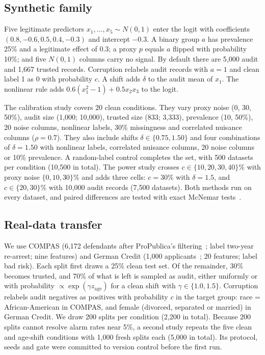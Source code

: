\documentclass[conference]{IEEEtran}
\begin{document}
\subsection{Synthetic family}
Five legitimate predictors $x_1,\dots,x_5\sim N(0,1)$ enter the logit with coefficients $(0.8,-0.6,0.5,0.4,-0.3)$ and intercept $-0.3$. A binary group $a$ has prevalence 25\% and a legitimate effect of 0.3; a proxy $p$ equals $a$ flipped with probability 10\%; and five $N(0,1)$ columns carry no signal. By default there are 5,000 audit and 1,667 trusted records. Corruption relabels audit records with $a=1$ and clean label 1 as 0 with probability $c$. A shift adds $\delta$ to the audit mean of $x_1$. The nonlinear rule adds $0.6(x_1^2-1)+0.5x_2x_3$ to the logit.

The calibration study covers 20 clean conditions. They vary proxy noise (0, 30, 50\%), audit size (1,000; 10,000), trusted size (833; 3,333), prevalence (10, 50\%), 20 noise columns, nonlinear labels, 30\% missingness and correlated nuisance columns ($\rho=0.7$). They also include shifts $\delta\in\{0.75,1.50\}$ and four combinations of $\delta=1.50$ with nonlinear labels, correlated nuisance columns, 20 noise columns or 10\% prevalence. A random-label control completes the set, with 500 datasets per condition (10,500 in total). The power study crosses $c\in\{10,20,30,40\}\%$ with proxy noise $\{0,10,30\}\%$ and adds three cells: $c=30\%$ with $\delta=1.5$, and $c\in\{20,30\}\%$ with 10,000 audit records (7,500 datasets). Both methods run on every dataset, and paired differences are tested with exact McNemar tests~\cite{mcnemar1947note}.

\subsection{Real-data transfer}
We use COMPAS (6,172 defendants after ProPublica's filtering~\cite{angwin2016machine}; label two-year re-arrest; nine features) and German Credit (1,000 applicants~\cite{hofmann1994statlog}; 20 features; label bad risk). Each split first draws a 25\% clean test set. Of the remainder, 30\% becomes trusted, and 70\% of what is left is sampled as audit, either uniformly or with probability $\propto\exp(\gamma z_{\text{age}})$ for a clean shift with $\gamma\in\{1.0,1.5\}$. Corruption relabels audit negatives as positives with probability $c$ in the target group: race = African-American in COMPAS, and female (divorced, separated or married) in German Credit. We draw 200 splits per condition (2,200 in total). Because 200 splits cannot resolve alarm rates near 5\%, a second study repeats the five clean and age-shift conditions with 1,000 fresh splits each (5,000 in total). Its protocol, seeds and gate were committed to version control before the first run.
\end{document}
